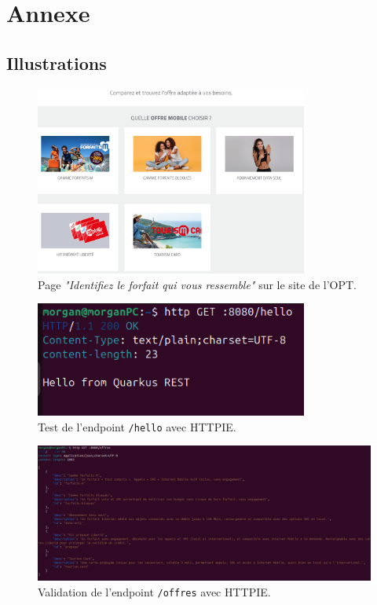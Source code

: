 \documentclass[11pt]{article}
\begin{document}
		
		\newpage
		\section{Annexe}
		\subsection{Illustrations}
			\begin{figure}[H]
			\centering
			\includegraphics[width=0.8\textwidth]{asset/page_forfait.png}
			\caption{Page \textit{"Identifiez le forfait qui vous ressemble"} sur le site de l’OPT.}
			\label{fig:page_forfait}
		\end{figure}
		\begin{figure}[H]
			\centering
			\includegraphics[width=0.8\textwidth]{asset/hello.png}
			\caption{Test de l'endpoint \texttt{/hello} avec HTTPIE.}
			\label{fig:hello_endpoint}
		\end{figure}
		\begin{figure}[H]
			\centering
			\includegraphics[width=1\textwidth]{asset/endpoint offres.png}
			\caption{Validation de l'endpoint \texttt{/offres} avec HTTPIE.}
			\label{fig:offres_endpoint}
		\end{figure}
\end{document}
